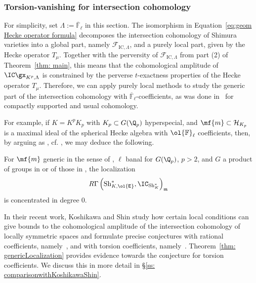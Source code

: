 \documentclass[letterpaper,11pt]{amsart}
\begin{document}
\subsubsection{Torsion-vanishing for intersection cohomology}
For simplicity, set $\Lambda:=\overline{\mathbb{F}}_{\ell}$ in this section. The isomorphism in Equation~\eqref{eq:geom Hecke operator formula} decomposes the intersection cohomology of Shimura varieties into a global part, namely $\mathcal{F}_{\mathrm{IC},\Lambda}$, and a purely local part, given by the Hecke operator $T_\mu$. Together 
with the perversity of $\mathcal{F}_{\mathrm{IC},\Lambda}$ from part (2) of Theorem~\ref{thm: main}, this means that the cohomological amplitude of $\IC\gx_{K^p,\Lambda}$ is constrained by the perverse $t$-exactness properties of the Hecke operator $T_\mu$. Therefore, we can apply purely local methods to study the generic part of the intersection cohomology with $\overline{\mathbb{F}}_{\ell}$-coefficients, as was done in~\cite{HamannLeeTorsion, YangZhuTorsion} for compactly supported and usual cohomology. 

For example, if $K = K^pK_p$ with $K_p\subset G(\Q_p)$ hyperspecial, and $\mf{m} \subset \mathcal{H}_{K_{p}}$ is a maximal ideal of the spherical Hecke algebra with $\ol{\mathbb{F}}_\ell$ coefficients, then, by arguing as \cite[Theorem~5.2]{HamannLeeTorsion}, cf. \cite[Theorem 10.1.6]{DvHKZ}, we may deduce the following.

\begin{theorem}{\label{thm: genericLocalization}}
For $\mf{m}$ generic in the sense of \cite[Definition~1.1]{HamannLeeTorsion}, 
$\ell$ banal for $G(\Q_p)$, $p > 2$, and $G$ a product of groups in \cite[Table (1)]{HamannLeeTorsion} or of those in \cite[Theorem~8.2.1]{peng2025farguesscholzeparameterstorsionvanishing}, the localization
\[ 
R\Gamma\left(\mathrm{Sh}^*_{K, \ol{\mathsf{E}}}, 
\IC_{\mathrm{Sh}^*_{K}}\right)_{\mathfrak{m}}
\]
is concentrated in degree $0$.
\end{theorem}

\begin{remark}\label{rem: Koshikawa-Shin} In their recent work, Koshikawa and Shin study how certain local conditions can give bounds to the cohomological amplitude of the intersection cohomology of locally symmetric spaces and formulate precise conjectures with rational coefficients, namely~\cite[Conjecture~1.2.1]{KoshikawaShin}, and with torsion coefficients, namely~\cite[Conjecture~6.2.1]{KoshikawaShin}. Theorem~\ref{thm: genericLocalization} provides evidence towards the conjecture for torsion coefficients. We discuss this in more detail in \S \ref{ss: comparisonwithKoshikawaShin}.  
\end{remark}
\end{document}
